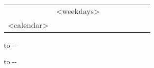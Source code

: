 \begin{tabularx}{\textwidth}{@{}l!{\vrule width \myLenLineThicknessThick}*{7}{@{}X@{}|}}
& <weekdays> \\ 
<calendar>
\end{tabularx}
\medskip

\parbox{\myLenTwoCol}{
    \vbox to \dimexpr\textheight-\pagetotal-\myHBL{}%
}
\hspace{\myLenTwoColSep}
\parbox{\myLenTwoCol}{
    \vbox to \dimexpr\textheight-\pagetotal-\myHBL{}%
}